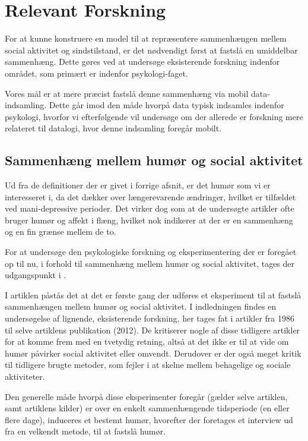 
\section{Relevant Forskning}
For at kunne konstruere en model til at repræsentere sammenhængen mellem social aktivitet og sindstilstand, er det nødvendigt først at fastslå en umiddelbar sammenhæng.
Dette gøres ved at undersøge eksisterende forskning indenfor området, som primært er indenfor psykologi-faget.

Vores mål er at mere præcist fastslå denne sammenhæng via mobil data-indsamling.
Dette går imod den måde hvorpå data typisk indsamles indenfor psykologi, hvorfor vi efterfølgende vil undersøge om der allerede er forskning mere relateret til datalogi, hvor denne indsamling foregår mobilt.

\subsection{Sammenhæng mellem humør og social aktivitet}
Ud fra de definitioner der er givet i forrige afsnit, er det humør som vi er interesseret i, da det dækker over længerevarende ændringer, hvilket er tilfældet ved mani-depressive perioder.
Det virker dog som at de undersøgte artikler ofte bruger humør og affekt i flæng, hvilket nok indikerer at der er en sammenhæng og en fin grænse mellem de to.

For at undersøge den psykologiske forskning og eksperimentering der er foregået op til nu, i forhold til sammenhæng mellem humør og social aktivitet, tages der udgangspunkt i \citet{whelan}.

I artiklen påstås det at det er første gang der udføres et eksperiment til at fastslå sammenhængen mellem humør og social aktivitet.
I indledningen findes en undersøgelse af lignende, eksisterende forskning, her tages fat i artikler fra 1986 til selve artiklens publikation (2012).
De kritiserer nogle af disse tidligere artikler for at komme frem med en tvetydig retning, altså at det ikke er til at vide om humør påvirker social aktivitet eller omvendt.
Derudover er der også meget kritik til tidligere brugte metoder, som fejler i at skelne mellem behagelige og sociale aktiviteter.

Den generelle måde hvorpå disse eksperimenter foregår (gælder selve artiklen, samt artiklens kilder) er over en enkelt sammenhængende tidsperiode (en eller flere dage), induceres et bestemt humør, hvorefter der foretages et interview ud fra en velkendt metode, til at fastslå humør.

